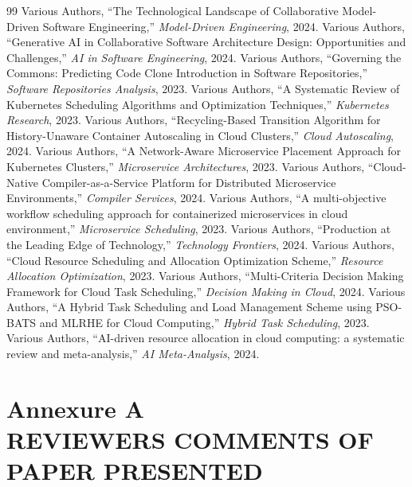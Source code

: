 \documentclass[12pt,a4paper]{report}
\begin{document}
{\begin{thebibliography}{99}
 Various Authors, ``The Technological Landscape of Collaborative Model-Driven Software Engineering,'' \textit{Model-Driven Engineering}, 2024.
 Various Authors, ``Generative AI in Collaborative Software Architecture Design: Opportunities and Challenges,'' \textit{AI in Software Engineering}, 2024.
 Various Authors, ``Governing the Commons: Predicting Code Clone Introduction in Software Repositories,'' \textit{Software Repositories Analysis}, 2023.
 Various Authors, ``A Systematic Review of Kubernetes Scheduling Algorithms and Optimization Techniques,'' \textit{Kubernetes Research}, 2023.
 Various Authors, ``Recycling-Based Transition Algorithm for History-Unaware Container Autoscaling in Cloud Clusters,'' \textit{Cloud Autoscaling}, 2024.
 Various Authors, ``A Network-Aware Microservice Placement Approach for Kubernetes Clusters,'' \textit{Microservice Architectures}, 2023.
 Various Authors, ``Cloud-Native Compiler-as-a-Service Platform for Distributed Microservice Environments,'' \textit{Compiler Services}, 2024.
 Various Authors, ``A multi-objective workflow scheduling approach for containerized microservices in cloud environment,'' \textit{Microservice Scheduling}, 2023.
 Various Authors, ``Production at the Leading Edge of Technology,'' \textit{Technology Frontiers}, 2024.
 Various Authors, ``Cloud Resource Scheduling and Allocation Optimization Scheme,'' \textit{Resource Allocation Optimization}, 2023.
 Various Authors, ``Multi-Criteria Decision Making Framework for Cloud Task Scheduling,'' \textit{Decision Making in Cloud}, 2024.
 Various Authors, ``A Hybrid Task Scheduling and Load Management Scheme using PSO-BATS and MLRHE for Cloud Computing,'' \textit{Hybrid Task Scheduling}, 2023.
 Various Authors, ``AI-driven resource allocation in cloud computing: a systematic review and meta-analysis,'' \textit{AI Meta-Analysis}, 2024.

\end{thebibliography}

\clearpage
\chapter*{Annexure A\\[0.3cm] REVIEWERS COMMENTS OF PAPER PRESENTED}

}
\end{document}
